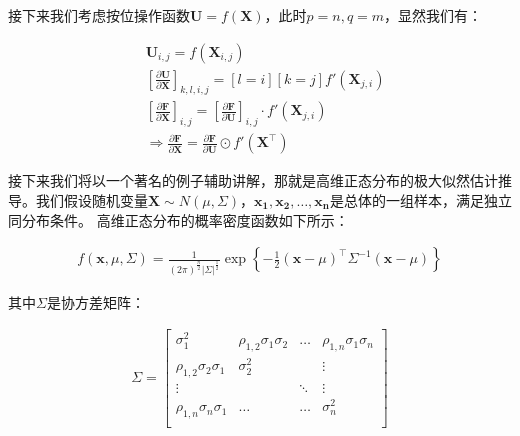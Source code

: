 \documentclass[UTF8]{book}
\begin{document}
接下来我们考虑按位操作函数$\mathbf{U}=f\left(\mathbf{X}\right)$，此时$p=n,q=m$，显然我们有：
\begin{large}
    \begin{equation}
        \begin{aligned}
            &\mathbf{U}_{i,j}=f(\mathbf{X}_{i,j}) \\
            &\left[ \frac{\partial \mathbf{U}}{\partial \mathbf{X}} \right]_{k,l,i,j}=[l=i][k=j]f'(\mathbf{X}_{j,i}) \\
            &\left[ \frac{\partial \mathbf{F}}{\partial \mathbf{X}} \right]_{i,j}=\left[ \frac{\partial \mathbf{F}}{\partial \mathbf{U}} \right]_{i,j} \cdot f'(\mathbf{X}_{j,i}) \\
            &\Rightarrow \frac{\partial \mathbf{F}}{\partial \mathbf{X}}=\frac{\partial \mathbf{F}}{\partial \mathbf{U}} \odot f'\left(\mathbf{X}^\top\right)
            \nonumber
        \end{aligned}
    \end{equation}
\end{large}
接下来我们将以一个著名的例子辅助讲解，那就是高维正态分布的极大似然估计推导。我们假设随机变量$\mathbf{X} \sim N(\mu, \Sigma)$，$\mathbf{x_1}, \mathbf{x_2}, \dots, \mathbf{x_n}$是总体的一组样本，满足独立同分布条件。
高维正态分布的概率密度函数如下所示：
\begin{large}
    \begin{equation}
        \begin{aligned}
            f(\mathbf{x},\mu,\Sigma)=\frac{1}{(2\pi)^{\frac{n}{2}}\left| \Sigma \right|^{\frac{1}{2}}}\exp \left\{ -\frac{1}{2}(\mathbf{x}-\mu)^\top \Sigma^{-1} (\mathbf{x}-\mu) \right\}
            \nonumber
        \end{aligned}
    \end{equation}
\end{large}
其中$\Sigma$是协方差矩阵：
\begin{large}
    \begin{equation}
        \begin{aligned}
            \Sigma = \begin{bmatrix}
            \sigma_1^2 & \rho_{1,2}\sigma_1\sigma_2 & \dots & \rho_{1,n}\sigma_1\sigma_n\\
            \rho_{1,2}\sigma_2\sigma_1 & \sigma_2^2  &  & \vdots \\
            \vdots &  & \ddots & \vdots \\
            \rho_{1,n}\sigma_n\sigma_1 & \dots & \dots & \sigma_n^2 \\
            \end{bmatrix}
            \nonumber
        \end{aligned}
    \end{equation}
\end{large}
\end{document}
